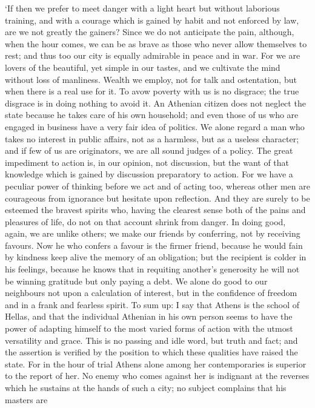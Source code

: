 `If then we prefer to meet danger with a light heart but without
laborious training, and with a courage which is gained by habit and
not enforced by law, are we not greatly the gainers? Since we do not
anticipate the pain, although, when the hour comes, we can be as brave
as those who never allow themselves to rest; and thus too our city is
equally admirable in peace and in war. For we are lovers of the
beautiful, yet simple in our tastes, and we cultivate the mind without
loss of manliness. Wealth we employ, not for talk and ostentation, but
when there is a real use for it. To avow poverty with us is no
disgrace; the true disgrace is in doing nothing to avoid it. An
Athenian citizen does not neglect the state because he takes care of
his own household; and even those of us who are engaged in business
have a very fair idea of politics. We alone regard a man who takes no
interest in public affairs, not as a harmless, but as a useless
character; and if few of us are originators, we are all sound judges
of a policy. The great impediment to action  is, in our
opinion, not discussion, but the want of that knowledge which is
gained by discussion preparatory to action. For we have a peculiar
power of thinking before we act and of acting too, whereas other men
are courageous from ignorance but hesitate upon reflection. And they
are surely to be esteemed the bravest spirits who, having the clearest
sense both of the pains and pleasures of life, do not on that account
shrink from danger. In doing good, again, we are unlike others; we
make our friends by conferring, not by receiving favours. Now he who
confers a favour is the firmer friend, because he would fain by
kindness keep alive the memory of an obligation; but the recipient is
colder in his feelings, because he knows that in requiting another's
generosity he will not be winning gratitude but only paying a debt. We
alone do good to our neighbours not upon a calculation of interest,
but in the confidence of freedom and in a frank and fearless spirit.
To sum up: I say that Athens is the school of Hellas, and that the
individual Athenian in his own person seems to have the power of
adapting himself to the most varied forms of action with the utmost
versatility and grace. This is no passing and idle word, but truth and
fact; and the assertion is verified by the position to which these
qualities have raised the state. For in the hour of trial Athens alone
among her contemporaries is superior to the report of her. No enemy
who comes against her is indignant at the reverses which he sustains
at the hands of such a city; no subject complains that his masters are
